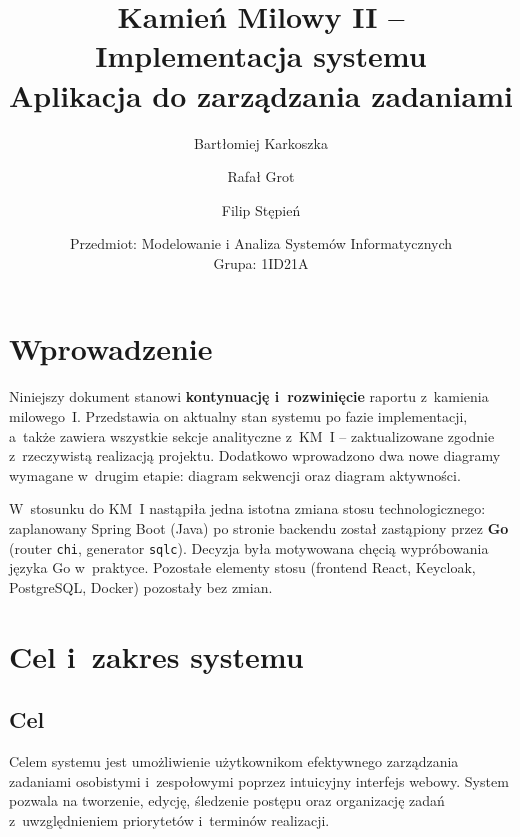 \documentclass[12pt, a4paper, oneside]{article}
\title{\LARGE\bfseries Kamień Milowy II -- Implementacja systemu\\[0.8cm]
  {\Large Aplikacja do zarządzania zadaniami}}
\author{Bartłomiej Karkoszka \and Rafał Grot \and Filip Stępień}
\date{Przedmiot: Modelowanie i Analiza Systemów Informatycznych\\Grupa: 1ID21A}
\begin{document}
\maketitle
\thispagestyle{empty}

\vspace{1.0cm}

\tableofcontents
\newpage

\section{Wprowadzenie}

Niniejszy dokument stanowi \textbf{kontynuację i~rozwinięcie} raportu z~kamienia milowego~I. Przedstawia on aktualny stan systemu po fazie implementacji, a~także zawiera wszystkie sekcje analityczne z~KM~I -- zaktualizowane zgodnie z~rzeczywistą realizacją projektu. Dodatkowo wprowadzono dwa nowe diagramy wymagane w~drugim etapie: diagram sekwencji oraz diagram aktywności.

W~stosunku do KM~I nastąpiła jedna istotna zmiana stosu technologicznego: zaplanowany Spring Boot (Java) po stronie backendu został zastąpiony przez \textbf{Go} (router \texttt{chi}, generator \texttt{sqlc}). Decyzja była motywowana chęcią wypróbowania języka Go w~praktyce. Pozostałe elementy stosu (frontend React, Keycloak, PostgreSQL, Docker) pozostały bez zmian.

\section{Cel i~zakres systemu}

\subsection{Cel}
Celem systemu jest umożliwienie użytkownikom efektywnego zarządzania zadaniami osobistymi i~zespołowymi poprzez intuicyjny interfejs webowy. System pozwala na tworzenie, edycję, śledzenie postępu oraz organizację zadań z~uwzględnieniem priorytetów i~terminów realizacji.
\end{document}

